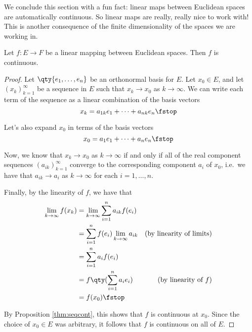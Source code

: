  We conclude this section with a fun fact: linear maps between Euclidean spaces are automatically continuous. So linear maps are really, really nice to work with! This is another consequence of the finite dimensionality of the spaces we are working in.

 \begin{theorem}
   \label{thm:lin-cont}
   Let \( f:E\to F \) be a linear mapping between Euclidean spaces. Then \( f \) is continuous.
 \end{theorem}
 \begin{proof}
   Let \( \qty{e_1,\dots, e_n} \) be an orthonormal basis for \( E \). Let \( x_0\in E \), and let \( (x_k)_{k=1}^\infty \) be a sequence in \( E \) such that \( x_k\to x_0 \) as \( k\to\infty \). We can write each term of the sequence as a linear combination of the basis vectors
   \[ x_k=a_{1k}e_1+\dots+a_{nk}e_n\fstop \]

   Let's also expand \( x_0 \) in terms of the basis vectors
   \[ x_0=a_1e_1+\dots+a_ne_n\fstop \]

   Now, we know that \( x_k\to x_0 \) as \( k\to\infty \) if and only if all of the real component sequences \( (a_{ik})_{k=1}^\infty \) converge to the corresponding component \( a_i \) of \( x_0 \), i.e.\ we have that \( a_{ik}\to a_i \) as \( k\to\infty \) for each \( i=1,\dots,n \).

   \vspace{3mm}

   Finally, by the linearity of \( f \), we have that
   \begin{align*}
     \lim_{k\to\infty}f(x_k)&= \lim_{k\to\infty}\sum_{i=1}^n a_{ik}f(e_i)\\
     &= \sum_{i=1}^n f(e_i)\lim_{k\to\infty} a_{ik} &(\text{by linearity of limits})\\
     &= \sum_{i=1}^n a_i f(e_i)\\
     &= f\qty(\sum_{i=1}^n a_ie_i) &(\text{by linearity of }f)\\
     &= f(x_0)\fstop
   \end{align*}

   By Proposition \ref{thm:seqcont}, this shows that \( f \) is continuous at \( x_0 \). Since the choice of \( x_0\in E \) was arbitrary, it follows that \( f \) is continuous on all of \( E \).
 \end{proof}

